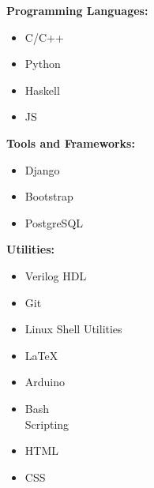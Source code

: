 \vspace{-0.2cm}
\textbf{Programming Languages:}
\vspace{-0.4cm}
\begin{multicols}{4}

\begin{itemize}

\item C/C++
\columnbreak
\item Python
\columnbreak
\item Haskell
\columnbreak
\item  JS


\end{itemize}
\end{multicols}
\vspace{-0.3cm}
\textbf{Tools and Frameworks:}
{\vspace{-0.4cm}}
\begin{multicols}{3}
\begin{itemize}
    \item Django
   
   
    \columnbreak
    \item Bootstrap
    \columnbreak

\item PostgreSQL
\end{itemize}
\end{multicols}
\vspace{-0.3cm}
\textbf{Utilities:}
{\vspace{-0.4cm}}
\begin{multicols}{3}
\begin{itemize}
\item Verilog HDL
\item Git
\item Linux Shell Utilities
\item \LaTeX
\item Arduino
  \item Bash\\Scripting
 
\item HTML
 \item CSS
\end{itemize}
\end{multicols}
\vspace{-0.5cm}
\vspace{-0.5cm}
